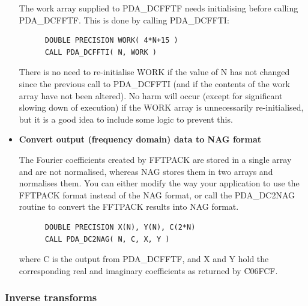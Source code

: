 \documentclass[11pt,twoside]{article}
\newcommand{\htmlref}[2]{#1}
\newcommand{\xlabel}[1]{}
\begin{document}
\begin{itemize}
   The work array supplied to PDA\_DCFFTF needs initialising before calling
   PDA\_DCFFTF. This is done by calling PDA\_DCFFTI:

\begin{verbatim}
      DOUBLE PRECISION WORK( 4*N+15 )
      CALL PDA_DCFFTI( N, WORK )
\end{verbatim}

   There is no need to re-initialise WORK if the value of N has not
   changed since the previous call to PDA\_DCFFTI (and if the contents of the
   work array have not been altered). No harm will occur (except for
   significant slowing down of execution) if the WORK array is
   unnecessarily re-initialised, but it is a good idea to include some
   logic to prevent this.

\item{\bf Convert output (frequency domain) data to NAG format}

   The Fourier coefficients created by FFTPACK are stored in a single
   array and are not normalised, whereas NAG stores them in two arrays
   and normalises them. You can either modify the way your application
   to use the FFTPACK format instead of the NAG format, or call the
\htmlref{PDA\_DC2NAG}{PDA\_C2NAG}
   routine to convert the FFTPACK results into NAG format. 

\begin{verbatim}
      DOUBLE PRECISION X(N), Y(N), C(2*N)
      CALL PDA_DC2NAG( N, C, X, Y )
\end{verbatim}

   where C is the output from PDA\_DCFFTF, and X and Y hold the corresponding 
   real and imaginary coefficients as returned by C06FCF.

   \end{itemize}


\subsubsection{\xlabel{inverse_transforms}Inverse transforms}
\end{document}
